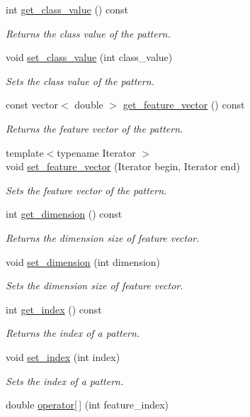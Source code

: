 \begin{DoxyCompactItemize}
int \hyperlink{classPattern_aae331219e63c782b23f203ebad3aa7bc}{get\+\_\+class\+\_\+value} () const 
\begin{DoxyCompactList}\small\item\em Returns the class value of the pattern. \end{DoxyCompactList}\item 
void \hyperlink{classPattern_ac4235d677a656d5cc272d192af210d4f}{set\+\_\+class\+\_\+value} (int class\+\_\+value)
\begin{DoxyCompactList}\small\item\em Sets the class value of the pattern. \end{DoxyCompactList}\item 
const vector$<$ double $>$ \hyperlink{classPattern_aae9583bcb7da91e9ae347a392ae77a52}{get\+\_\+feature\+\_\+vector} () const 
\begin{DoxyCompactList}\small\item\em Returns the feature vector of the pattern. \end{DoxyCompactList}\item 
{\footnotesize template$<$typename Iterator $>$ }\\void \hyperlink{classPattern_a325cfe99a75f6e2befccef37ea347135}{set\+\_\+feature\+\_\+vector} (Iterator begin, Iterator end)
\begin{DoxyCompactList}\small\item\em Sets the feature vector of the pattern. \end{DoxyCompactList}\item 
int \hyperlink{classPattern_a3301651f9617962a7dd15575d381d8de}{get\+\_\+dimension} () const 
\begin{DoxyCompactList}\small\item\em Returns the dimension size of feature vector. \end{DoxyCompactList}\item 
void \hyperlink{classPattern_aa498151def7e9e9fabf874bfead90b3b}{set\+\_\+dimension} (int dimension)
\begin{DoxyCompactList}\small\item\em Sets the dimension size of feature vector. \end{DoxyCompactList}\item 
int \hyperlink{classPattern_a96c0f3b51801a27d0f8b06031b508b42}{get\+\_\+index} () const 
\begin{DoxyCompactList}\small\item\em Returns the index of a pattern. \end{DoxyCompactList}\item 
void \hyperlink{classPattern_ad74cb513a6a76c20121297f2ab867a07}{set\+\_\+index} (int index)
\begin{DoxyCompactList}\small\item\em Sets the index of a pattern. \end{DoxyCompactList}\item 
double \hyperlink{classPattern_a979a9f332fc23c453659fc4d4d2ae8c5}{operator\mbox{[}$\,$\mbox{]}} (int feature\+\_\+index)
\end{DoxyCompactItemize}
